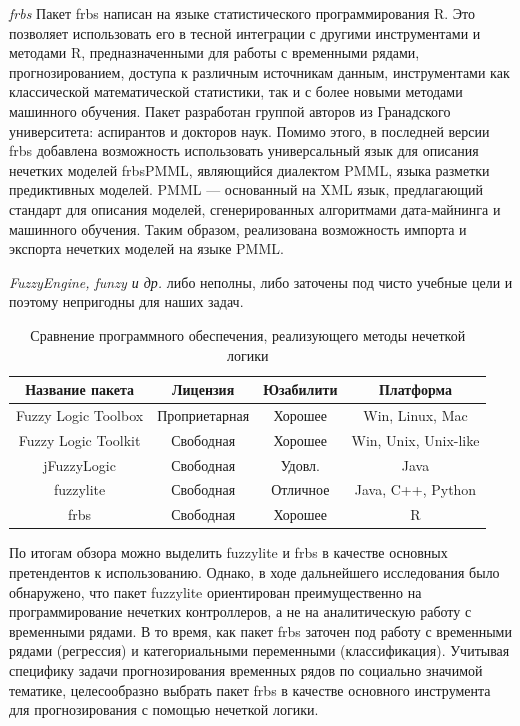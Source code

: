\textit{frbs} Пакет frbs написан на языке статистического программирования R.
Это позволяет использовать его в тесной интеграции с другими инструментами и
методами R, предназначенными для работы с временными рядами, прогнозированием,
доступа к различным источникам данным, инструментами как классической
математической статистики, так и с более новыми методами машинного обучения.
Пакет разработан группой авторов из Гранадского университета: аспирантов и
докторов наук. Помимо этого, в последней версии frbs добавлена возможность
использовать универсальный язык для описания нечетких моделей frbsPMML,
являющийся диалектом PMML, языка разметки предиктивных моделей. PMML ---
основанный на XML язык, предлагающий стандарт для описания моделей,
сгенерированных алгоритмами дата-майнинга и машинного обучения. Таким образом,
реализована возможность импорта и экспорта нечетких моделей на языке PMML.

\textit{FuzzyEngine, funzy и др.} либо неполны, либо заточены под чисто учебные
цели и поэтому непригодны для наших задач. 

\begin{table}[bhtp]
    \caption{Сравнение программного обеспечения, реализующего методы нечеткой
        логики}
	\begin{center}
        \begin{tabular}{ | c | c | c | c |}
			\hline
            Название пакета & Лицензия & Юзабилити & Платформа \\
			\hline
            Fuzzy Logic Toolbox & Проприетарная & Хорошее &
            Win, Linux, Mac\\
			\hline
            Fuzzy Logic Toolkit & Свободная & Хорошее &
            Win, Unix, Unix-like\\
			\hline
            jFuzzyLogic & Свободная & Удовл. &
            Java\\
			\hline
            fuzzylite & Свободная & Отличное &
            Java, C++, Python\\
			\hline
            frbs & Свободная & Хорошее &
            R\\
			\hline
		\end{tabular}		
	\end{center}
    \label{table:soft_comparison}	
\end{table}

По итогам обзора можно выделить fuzzylite и frbs в качестве основных
претендентов к использованию. Однако, в ходе дальнейшего исследования было
обнаружено, что пакет fuzzylite ориентирован преимущественно на программирование
нечетких контроллеров, а не на аналитическую работу с временными рядами. В то
время, как пакет frbs заточен под работу с временными рядами (регрессия) и
категориальными переменными (классификация). Учитывая специфику задачи
прогнозирования временных рядов по социально значимой тематике, целесообразно
выбрать пакет frbs в качестве основного инструмента для прогнозирования с
помощью нечеткой логики.

